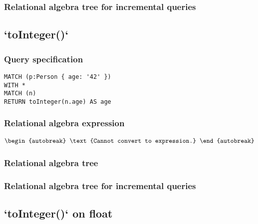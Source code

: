 
\subsubsection*{Relational algebra tree for incremental queries}


\subsection{`toInteger()`}

\subsubsection*{Query specification}

\begin{lstlisting}
MATCH (p:Person { age: '42' })
WITH *
MATCH (n)
RETURN toInteger(n.age) AS age
\end{lstlisting}

\subsubsection*{Relational algebra expression}

\begin{align*}
\begin{autobreak}
\text{Cannot convert to expression.}
\end{autobreak}
\end{align*}

\subsubsection*{Relational algebra tree}


\subsubsection*{Relational algebra tree for incremental queries}


\subsection{`toInteger()` on float}

